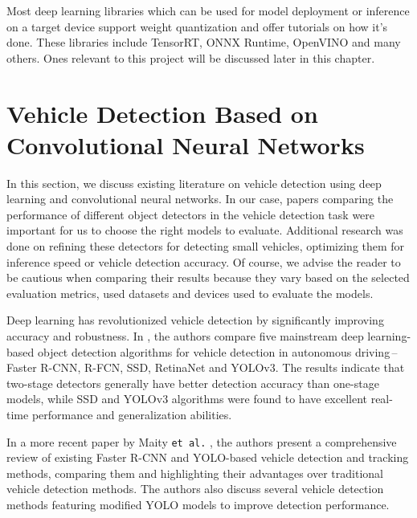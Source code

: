 
Most deep learning libraries which can be used for model deployment or inference
on a target device support weight quantization and offer tutorials on how it's
done. These libraries include TensorRT, ONNX Runtime, OpenVINO and many others.
Ones relevant to this project will be discussed later in this chapter.





\section{Vehicle Detection Based on Convolutional Neural Networks}


In this section, we discuss existing literature on vehicle detection using deep
learning and convolutional neural networks. In our case, papers comparing the
performance of different object detectors in the vehicle detection task were
important for us to choose the right models to evaluate. Additional research was
done on refining these detectors for detecting small vehicles, optimizing them
for inference speed or vehicle detection accuracy. Of course, we advise the
reader to be cautious when comparing their results because they vary based on
the selected evaluation metrics, used datasets and devices used to evaluate the
models.

Deep learning has revolutionized vehicle detection by significantly improving
accuracy and robustness. In \cite{Wang2019}, the authors compare five mainstream
deep learning-based object detection algorithms for vehicle detection in
autonomous driving\,--\,Faster R-CNN, R-FCN, SSD, RetinaNet and YOLOv3. The
results indicate that two-stage detectors generally have better detection
accuracy than one-stage models, while SSD and YOLOv3 algorithms were found to
have excellent real-time performance and generalization abilities. 

In a more recent paper by Maity \texttt{et al.} \cite{Maity2021},
the authors present a comprehensive review of existing Faster R-CNN and
YOLO-based vehicle detection and tracking methods, comparing them and
highlighting their advantages over traditional vehicle detection methods. The
authors also discuss several vehicle detection methods featuring modified YOLO
models to improve detection performance.

